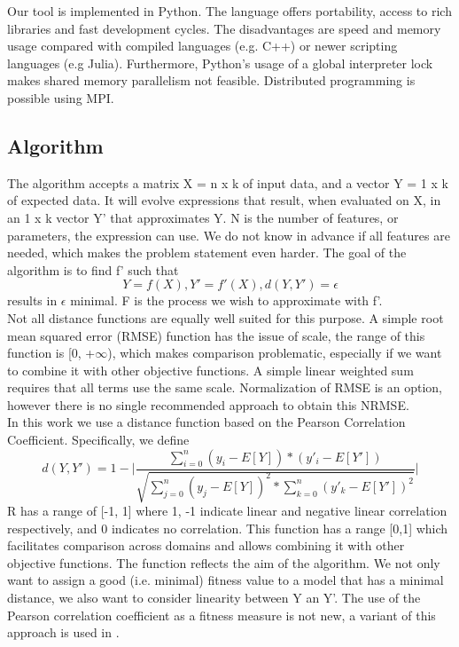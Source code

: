 Our tool is implemented in Python. The language offers portability, access to rich libraries and fast development cycles. The disadvantages are speed and memory usage compared with compiled languages (e.g. C++) or newer scripting languages (e.g Julia).
Furthermore, Python's usage of a global interpreter lock makes shared memory parallelism not feasible. Distributed programming is possible using MPI.
\subsection{Algorithm}
The algorithm accepts a matrix X = n x k of input data, and a vector Y = 1 x k of expected data. It will evolve expressions that result, when evaluated on X, in an 1 x k vector Y' that approximates Y. N is the number of features, or parameters, the expression can use. We do not know in advance if all features are needed, which makes the problem statement even harder.
The goal of the algorithm is to find f' such that
\[Y = f(X) , Y' = f'(X) , d(Y, Y')=\epsilon\]
results in $\epsilon$ minimal. F is the process we wish to approximate with f'.\\
Not all distance functions are equally well suited for this purpose. A simple root mean squared error (RMSE) function has the issue of scale, the range of this function is [0, +$\infty$), which makes comparison problematic, especially if we want to combine it with other objective functions. A simple linear weighted sum requires that all terms use the same scale.
Normalization of RMSE is an option, however there is no single recommended approach to obtain this NRMSE. \\
In this work we use a distance function based on the Pearson Correlation Coefficient. Specifically, we define
\[
d(Y, Y') = 1 - 
\lvert \frac{\sum_{i=0}^{n}{(y_i-E[Y])*(y'_i-E[Y'])}}{\sqrt{\sum_{j=0}^{n}{(y_j-E[Y])^2}*\sum_{k=0}^{n}{(y'_k-E[Y'])^2}}}
 \lvert \]
R has a range of [-1, 1] where 1, -1 indicate linear and negative linear correlation respectively, and 0 indicates no correlation.
This function has a range [0,1] which facilitates comparison across domains and allows combining it with other objective functions.
The function reflects the aim of the algorithm. We not only want to assign a good (i.e. minimal) fitness value to a model that has a minimal distance, we also want to consider linearity between Y an Y'. The use of the Pearson correlation coefficient as a fitness measure is not new, a variant of this approach is used in \citep{pearson}.
